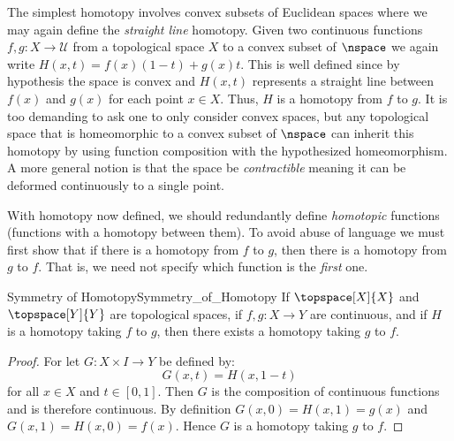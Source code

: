 \documentclass{book}                                                           %
\begin{document}
                \begin{example}
                    \label{ex:Straight_Line_Homotopy_Euc_Spaces}%
                    The simplest homotopy involves convex subsets of Euclidean
                    spaces where we may again define the \textit{straight line}
                    homotopy. Given two continuous functions
                    $f,g:X\rightarrow\mathcal{U}$ from a topological space $X$
                    to a convex subset of $\nspace$ we again write
                    $H(x,t)=f(x)(1-t)+g(x)t$. This is well defined since by
                    hypothesis the space is convex and $H(x,t)$ represents a
                    straight line between $f(x)$ and $g(x)$ for each point
                    $x\in{X}$. Thus, $H$ is a homotopy from $f$ to $g$. It is
                    too demanding to ask one to only consider convex spaces, but
                    any topological space that is homeomorphic to a convex
                    subset of $\nspace$ can inherit this homotopy by using
                    function composition with the hypothesized homeomorphism. A
                    more general notion is that the space be
                    \textit{contractible} meaning it can be deformed
                    continuously to a single point.
                \end{example}
                With homotopy now defined, we should redundantly define
                \textit{homotopic} functions (functions with a homotopy between
                them). To avoid abuse of language we must first show that if
                there is a homotopy from $f$ to $g$, then there is a homotopy
                from $g$ to $f$. That is, we need not specify which function is
                the \textit{first} one.
                \begin{ltheorem}{Symmetry of Homotopy}{Symmetry_of_Homotopy}
                    If $\topspace[X]{X}$ and $\topspace[Y]{Y}$ are topological
                    spaces, if $f,g:X\rightarrow{Y}$ are continuous, and if $H$
                    is a homotopy taking $f$ to $g$, then there exists a
                    homotopy taking $g$ to $f$.
                \end{ltheorem}
                \begin{proof}
                    For let $G:X\times{I}\rightarrow{Y}$ be defined by:
                    \begin{equation}
                        G(x,t)=H(x,1-t)
                    \end{equation}
                    for all $x\in{X}$ and $t\in[0,1]$. Then $G$ is the
                    composition of continuous functions and is therefore
                    continuous. By definition $G(x,0)=H(x,1)=g(x)$ and
                    $G(x,1)=H(x,0)=f(x)$. Hence $G$ is a homotopy taking $g$ to
                    $f$.
                \end{proof}
\end{document}
